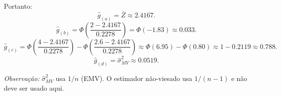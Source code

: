 Portanto:
\[
\widehat g_{(a)}=\bar Z\approx 2.4167.
\]
\[
\widehat g_{(b)}=
\Phi\!\left(\frac{2-2.4167}{0.2278}\right)
=\Phi(-1.83)\approx 0.033.
\]
\[
\widehat g_{(c)}=
\Phi\!\left(\frac{4-2.4167}{0.2278}\right)-
\Phi\!\left(\frac{2.6-2.4167}{0.2278}\right)
\approx \Phi(6.95)-\Phi(0.80)
\approx 1-0.2119
\approx 0.788.
\]
\[
\widehat g_{(d)}=\widehat\sigma^2_{MV}\approx 0.0519.
\]

\medskip
\textit{Observação:} $\widehat\sigma^2_{MV}$ usa $1/n$ (EMV). O estimador não-viesado
usa $1/(n-1)$ e não deve ser usado aqui.